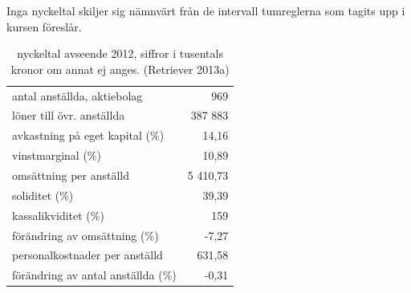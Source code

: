 \documentclass[10pt,a4paper]{article}
\begin{document}
Inga nyckeltal skiljer sig nämnvärt från de intervall tumreglerna som tagits upp i kursen föreslår.
\begin{table}[h]
	\begin{tabular}{ l r }
		antal anställda, aktiebolag & 969\\
		löner till övr. anställda & 387 883\\
		avkastning på eget kapital (\%) & 14,16\\
		vinstmarginal (\%) & 10,89\\
		omsättning per anställd & 5 410,73\\
		soliditet (\%) & 39,39\\
		kassalikviditet (\%) & 159\\
		förändring av omsättning (\%) & -7,27\\
		personalkostnader per anställd & 631,58\\
		förändring av antal anställda (\%) & -0,31\\

	\end{tabular}
	\caption{nyckeltal avseende 2012, siffror i tusentals kronor om annat ej anges. (Retriever 2013a)}
	\label{table:nyckeltal}
\end{table}
\end{document}
